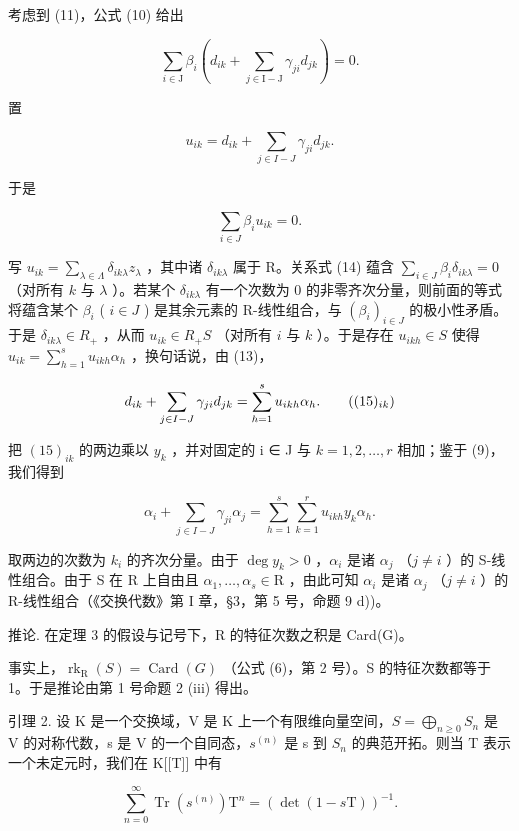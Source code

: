 考虑到 (11)，公式 (10) 给出

\[
\sum_ {i \in \mathrm{J}} \beta_ {i} \left(d _ {i k} + \sum_ {j \in \mathrm{I} - \mathrm{J}} \gamma_ {j i} d _ {j k}\right) = 0.\tag{12}
\]

置

\[
u _ {i k} = d _ {i k} + \sum_ {j \in I - J} \gamma_ {j i} d _ {j k}.\tag{13}
\]

于是

\[
\sum_ {i \in J} \beta_ {i} u _ {i k} = 0.\tag{14}
\]

写 \(u_{ik} = \sum_{\lambda \in \Lambda} \delta_{ik\lambda} z_\lambda\) ，其中诸 \(\delta_{ik\lambda}\) 属于 R。关系式 (14) 蕴含 \(\sum_{i \in J} \beta_i \delta_{ik\lambda} = 0\) （对所有 \(k\) 与 \(\lambda\) ）。若某个 \(\delta_{ik\lambda}\) 有一个次数为 0 的非零齐次分量，则前面的等式将蕴含某个 \(\beta_i\) ( \(i \in J\) ) 是其余元素的 R-线性组合，与 \((\beta_i)_{i \in J}\) 的极小性矛盾。于是 \(\delta_{ik\lambda} \in R_+\) ，从而 \(u_{ik} \in R_+ S\) （对所有 \(i\) 与 \(k\) ）。于是存在 \(u_{ikh} \in S\) 使得 \(u_{ik} = \sum_{h=1}^{s} u_{ikh} \alpha_h\) ，换句话说，由 (13)，

\[
d _ {i k} + \sum_ {j \in I - J} \gamma_ {j i} d _ {j k} = \sum_ {h = 1} ^ {s} u _ {i k h} \alpha_ {h}.\tag{$(15)_{ik}$}
\]

把 \((15)_{ik}\) 的两边乘以 \(y_{k}\) ，并对固定的 i ∈ J 与 \(k = 1, 2, \ldots, r\) 相加；鉴于 (9)，我们得到

\[
\alpha_ {i} + \sum_ {j \in I - J} \gamma_ {j i} \alpha_ {j} = \sum_ {h = 1} ^ {s} \sum_ {k = 1} ^ {r} u _ {i k h} y _ {k} \alpha_ {h}.
\]

取两边的次数为 \(k_i\) 的齐次分量。由于 \(\deg y_k > 0\) ，\(\alpha_i\) 是诸 \(\alpha_j\) （\(j \neq i\) ）的 S-线性组合。由于 S 在 R 上自由且 \(\alpha_1, \ldots, \alpha_s \in \mathrm{R}\) ，由此可知 \(\alpha_i\) 是诸 \(\alpha_j\) （\(j \neq i\) ）的 R-线性组合（《交换代数》第 I 章，§3，第 5 号，命题 9 d))。

推论. 在定理 3 的假设与记号下，R 的特征次数之积是 Card(G)。

事实上，\(\operatorname{rk}_{\mathrm{R}}(S) = \operatorname{Card}(G)\) （公式 (6)，第 2 号）。S 的特征次数都等于 1。于是推论由第 1 号命题 2 (iii) 得出。

引理 2. 设 K 是一个交换域，V 是 K 上一个有限维向量空间，\(S = \bigoplus_{n \geqslant 0} S_n\) 是 V 的对称代数，s 是 V 的一个自同态，\(s^{(n)}\) 是 s 到 \(S_n\) 的典范开拓。则当 T 表示一个未定元时，我们在 K{[}{[}T{]}{]} 中有

\[
\sum_ {n = 0} ^ {\infty} \operatorname{Tr} (s ^ {(n)}) \mathrm{T} ^ {n} = (\det (1 - s \mathrm{T})) ^ {- 1}.
\]

